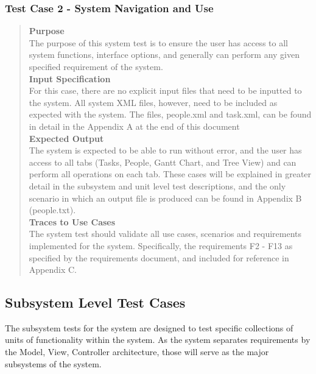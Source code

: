 \documentclass[12pt]{article}
\begin{document}
\subsubsection {Test Case 2 - System Navigation and Use}
\begin{quote}
{\bf Purpose}
\\
{
The purpose of this system test is to ensure the user has access to all system functions, interface options, and generally can perform any given specified requirement of the system. \\
}
{\bf Input Specification}
\\
{
For this case, there are no explicit input files that need to be inputted to the system. All system XML files, however, need to be included as expected with the system. The files, people.xml and task.xml, can be found in detail in the Appendix A at the end of this document
}
\\
{\bf Expected Output}
\\
{
The system is expected to be able to run without error, and the user has access to all tabs (Tasks, People, Gantt Chart, and Tree View) and can perform all operations on each tab. These cases will be explained in greater detail in the subsystem and unit level test descriptions, and the only scenario in which an output file is produced can be found in Appendix B (people.txt).
}
\\
{\bf Traces to Use Cases}
\\
{
The system test should validate all use cases, scenarios and requirements implemented for the system. Specifically, the requirements F2 - F13 as specified by the requirements document, and included for reference in Appendix C.
}
\end{quote}

\subsection{Subsystem Level Test Cases}
{
The subsystem tests for the system are designed to test specific collections of units of functionality within the system. As the system separates requirements by the Model, View, Controller architecture, those will serve as the major subsystems of the system.
}
\end{document}
